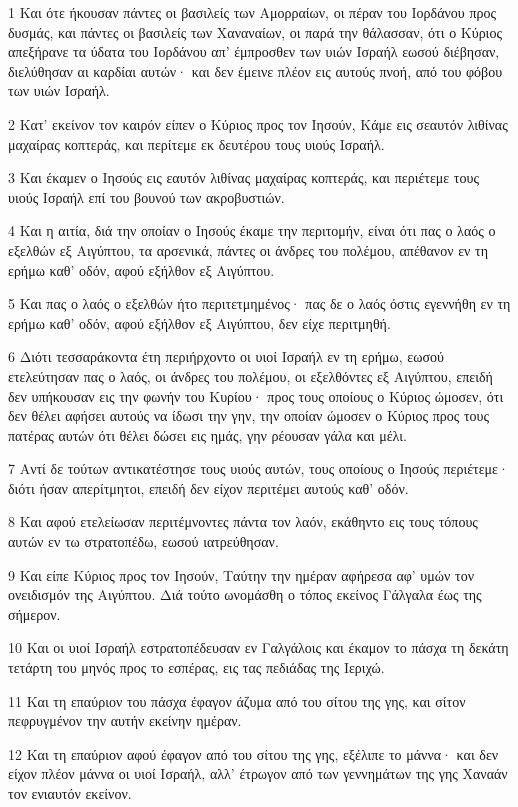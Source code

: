 \par 1 Και ότε ήκουσαν πάντες οι βασιλείς των Αμορραίων, οι πέραν του Ιορδάνου προς δυσμάς, και πάντες οι βασιλείς των Χαναναίων, οι παρά την θάλασσαν, ότι ο Κύριος απεξήρανε τα ύδατα του Ιορδάνου απ' έμπροσθεν των υιών Ισραήλ εωσού διέβησαν, διελύθησαν αι καρδίαι αυτών· και δεν έμεινε πλέον εις αυτούς πνοή, από του φόβου των υιών Ισραήλ.
\par 2 Κατ' εκείνον τον καιρόν είπεν ο Κύριος προς τον Ιησούν, Κάμε εις σεαυτόν λιθίνας μαχαίρας κοπτεράς, και περίτεμε εκ δευτέρου τους υιούς Ισραήλ.
\par 3 Και έκαμεν ο Ιησούς εις εαυτόν λιθίνας μαχαίρας κοπτεράς, και περιέτεμε τους υιούς Ισραήλ επί του βουνού των ακροβυστιών.
\par 4 Και η αιτία, διά την οποίαν ο Ιησούς έκαμε την περιτομήν, είναι ότι πας ο λαός ο εξελθών εξ Αιγύπτου, τα αρσενικά, πάντες οι άνδρες του πολέμου, απέθανον εν τη ερήμω καθ' οδόν, αφού εξήλθον εξ Αιγύπτου.
\par 5 Και πας ο λαός ο εξελθών ήτο περιτετμημένος· πας δε ο λαός όστις εγεννήθη εν τη ερήμω καθ' οδόν, αφού εξήλθον εξ Αιγύπτου, δεν είχε περιτμηθή.
\par 6 Διότι τεσσαράκοντα έτη περιήρχοντο οι υιοί Ισραήλ εν τη ερήμω, εωσού ετελεύτησαν πας ο λαός, οι άνδρες του πολέμου, οι εξελθόντες εξ Αιγύπτου, επειδή δεν υπήκουσαν εις την φωνήν του Κυρίου· προς τους οποίους ο Κύριος ώμοσεν, ότι δεν θέλει αφήσει αυτούς να ίδωσι την γην, την οποίαν ώμοσεν ο Κύριος προς τους πατέρας αυτών ότι θέλει δώσει εις ημάς, γην ρέουσαν γάλα και μέλι.
\par 7 Αντί δε τούτων αντικατέστησε τους υιούς αυτών, τους οποίους ο Ιησούς περιέτεμε· διότι ήσαν απερίτμητοι, επειδή δεν είχον περιτέμει αυτούς καθ' οδόν.
\par 8 Και αφού ετελείωσαν περιτέμνοντες πάντα τον λαόν, εκάθηντο εις τους τόπους αυτών εν τω στρατοπέδω, εωσού ιατρεύθησαν.
\par 9 Και είπε Κύριος προς τον Ιησούν, Ταύτην την ημέραν αφήρεσα αφ' υμών τον ονειδισμόν της Αιγύπτου. Διά τούτο ωνομάσθη ο τόπος εκείνος Γάλγαλα έως της σήμερον.
\par 10 Και οι υιοί Ισραήλ εστρατοπέδευσαν εν Γαλγάλοις και έκαμον το πάσχα τη δεκάτη τετάρτη του μηνός προς το εσπέρας, εις τας πεδιάδας της Ιεριχώ.
\par 11 Και τη επαύριον του πάσχα έφαγον άζυμα από του σίτου της γης, και σίτον πεφρυγμένον την αυτήν εκείνην ημέραν.
\par 12 Και τη επαύριον αφού έφαγον από του σίτου της γης, εξέλιπε το μάννα· και δεν είχον πλέον μάννα οι υιοί Ισραήλ, αλλ' έτρωγον από των γεννημάτων της γης Χαναάν τον ενιαυτόν εκείνον.

